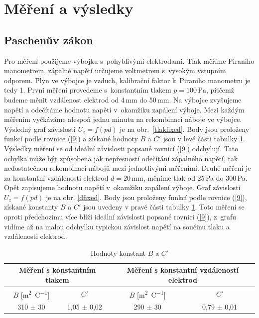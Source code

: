 \documentclass[a4paper,12pt]{article}
\begin{document}
\section{Měření a výsledky}
\subsection{Paschenův zákon}
Pro měření použijeme výbojku s~pohyblivými elektrodami. Tlak měříme Piraniho 
manometrem, zápalné napětí určujeme voltmetrem s~vysokým vstupním odporem. Plyn 
ve výbojce je vzduch, kalibrační faktor k~Piraniho manometru je tedy 1. První 
měření provedeme s~konstantním tlakem $p = 100\,\si{\pascal}$, přičemž budeme 
měnit vzdálenost elektrod od 4\,\si{\milli\meter} do 50\,\si{\milli\meter}. Na 
výbojce zvyšujeme napětí a odečítáme hodnotu napětí v~okamžiku zapálení výboje. 
Mezi každým měřením vyčkáváme alespoň jednu minutu na rekombinaci náboje ve 
výbojce. Výsledný graf závislosti $U_z = f(pd)$ je na obr.~\ref{tlakfixed}. 
Body jsou proloženy funkcí podle rovnice (\ref{9}) a získané hodnoty $B$ 
a $C'$ jsou v levé části tabulky \ref{tab1}. Výsledky měření se od ideální závislosti popsané 
rovnicí (\ref{9}) odchylují. Tato ochylka může být způsobena jak 
nepřesností odečítání zápalného napětí, tak nedostatečnou rekombinací nábojů 
mezi jednotlivými měřeními. 
Druhé měření je za konstantní vzdálenosti elektrod $d = 20\,\si{\milli\meter}$, 
měníme tlak od 25\,\si{\pascal} do 300\,\si{\pascal}. Opět zapisujeme hodnotu 
napětí v~okamžiku zapálení výboje. Graf závislosti $U_z = f(pd)$ je na obr. 
\ref{dfixed}. Body jsou proloženy funkcí podle rovnice (\ref{9}), získané konstanty 
$B$ a $C'$ jsou uvedeny v pravé části tabulky \ref{tab1}. Toto měření se oproti předchozímu více 
blíží ideální závislosti popsané rovnicí (\ref{9}), z~grafu vidíme až na malou 
odchylku typickou závislost napětí na součinu tlaku a vzdálenosti elektrod.

\begin{center}
	\begin{table}[h]
		\centering
		\caption{Hodnoty konstant $B$ a $C'$}
		\label{tab1}
		\begin{tabular}{|c|c|c|c|} \hline
			\multicolumn{2}{|c|}{Měření s konstantním tlakem} 
			& \multicolumn{2}{c|}{Měření s konstantní vzdáleností elektrod}  \\ \hline
			$B$ [\si{\meter\squared\per\coulomb}] & $C'$ 
			& $B$ [\si{\meter\squared\per\coulomb}] & $C'$ \\ \hline
			310 $\pm$ 30 & 1,05 $\pm$ 0,02 &  290 $\pm$ 30  
			& 0,79 $\pm$ 0,01 \\ \hline

		\end{tabular}
	\end{table}
\end{center}
\end{document}
